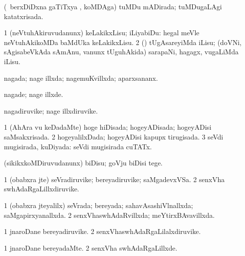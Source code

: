 {{\bentry
{} 
\gl{\gu}
\expl{}
\bmng
(\kanmu\ berxDiDxna gaTiTxya \vi, koMDAga) tuMDu mADirada; tuMDugaLAgi katatxrisada. 
\emng
\eentry

\bentry
{} 
\gl{\akirx}
\bmng
\bnum
\num{1} (neVtuhAkiruvudanunx) keLakikxLisu; iLiyabiDu:  hegal meVle neVtuhAkikoMDa baMdUka keLakikxLisu. 
\num{2} (\nw) tUgAsareyiMda iLisu; (doVNi, sAgisabeVkAda sAmAnu, \mo vanunx tUguhAkida) sarapaNi, hagagx, \mo vugaLiMda iLisu. 
\enum
\emng
\eentry

\bentry
{} 
\gl{\gu}
\expl{}
\bmng
nagada; nage illxda; nagemuKvillxda; aparxsananx. 
\emng
\eentry

\bentry
{} 
\gl{\kirxvi}
\expl{}
\bmng
nagade; nage illxde. 
\emng
\eentry

\bentry
{} 
\gl{\nA}
\expl{}
\bmng
nagadiruvike; nage illxdiruvike. 
\emng
\eentry

\bentry
{} 
\gl{\gu}
\expl{}
\bmng
\bnum
\num{1} (AhAra \mo vu keDadaMte) hoge hiDisada; hogeyADisada; hogeyADisi saMsakxrisada. 
\num{2} hogeyalilxDada; hogeyADisi kapupx tirugisada. 
\num{3} seVdi mugisirada, kuDiyada:  seVdi mugisirada cuTATx. 
\enum
\emng
\eentry

\bentry
{} 
\gl{\sakirx}
\expl{}
\bmng
(sikikxkoMDiruvudanunx) biDisu; goVju biDisi tege. 
\emng
\eentry

\bentry
{} 
\gl{\nA}
\expl{}
\bmng
\bnum
\num{1} (obabxra jte) seVradiruvike; bereyadiruvike; saMgadevxVSa. 
\num{2} senxVha swhAdaRgaLillxdiruvike. 
\enum
\emng
\eentry

\bentry
{} 
\gl{\gu}
\expl{}
\bmng
\bnum
\num{1} (obabxra jteyalilx) seVrada; bereyada; sahavAsashiVlnallxda; saMgapirxyanallxda. 
\num{2} senxVhaswhAdaRvillxda; meYtirxBAvavillxda. 
\enum
\emng
\eentry

\bentry
{} 
\gl{\nA}
\expl{}
\bmng
\bnum
\num{1} jnaroDane bereyadiruvike. 
\num{2} senxVhaswhAdaRgaLilalxdiruvike. 
\enum
\emng
\eentry

\bentry
{} 
\gl{\kirxvi}
\expl{}
\bmng
\bnum
\num{1} jnaroDane bereyadaMte. 
\num{2} senxVha swhAdaRgaLillxde. 
\enum
\emng
\eentry

}}
